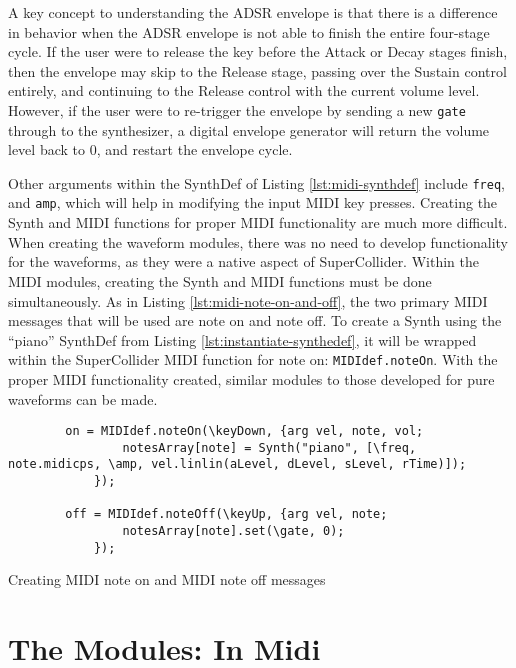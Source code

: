 A key concept to understanding the ADSR envelope is that there is a difference in behavior when the ADSR envelope is not able to finish the entire four-stage cycle. If the user were to release the key before the Attack or Decay stages finish, then the envelope may skip to the Release stage, passing over the Sustain control entirely, and continuing to the Release control with the current volume level. However, if the user were to re-trigger the envelope by sending a new \texttt{gate} through to the synthesizer, a digital envelope generator will return the volume level back to 0, and restart the envelope cycle.

Other arguments within the SynthDef of Listing \ref{lst:midi-synthdef} include \texttt{freq}, and \texttt{amp}, which will help in modifying the input MIDI key presses. Creating the Synth and MIDI functions for proper MIDI functionality are much more difficult. When creating the waveform modules, there was no need to develop functionality for the waveforms, as they were a native aspect of SuperCollider. Within the MIDI modules, creating the Synth and MIDI functions must be done simultaneously. As in Listing \ref{lst:midi-note-on-and-off}, the two primary MIDI messages that will be used are note on and note off. To create a Synth using the ``piano'' SynthDef from Listing \ref{lst:instantiate-synthedef}, it will be wrapped within the SuperCollider MIDI function for note on: \texttt{MIDIdef.noteOn}. With the proper MIDI functionality created, similar modules to those developed for pure waveforms can be made.

\begin{listing}
	\begin{lstlisting}
		on = MIDIdef.noteOn(\keyDown, {arg vel, note, vol;
				notesArray[note] = Synth("piano", [\freq, note.midicps, \amp, vel.linlin(aLevel, dLevel, sLevel, rTime)]);
			});

		off = MIDIdef.noteOff(\keyUp, {arg vel, note;
				notesArray[note].set(\gate, 0);
			});
	\end{lstlisting}
	\caption{Creating MIDI note on and MIDI note off messages}
	\label{lst:midi-note-on-and-off}	
\end{listing}


\section{The Modules: In Midi}\label{section:the-modules-midi}


